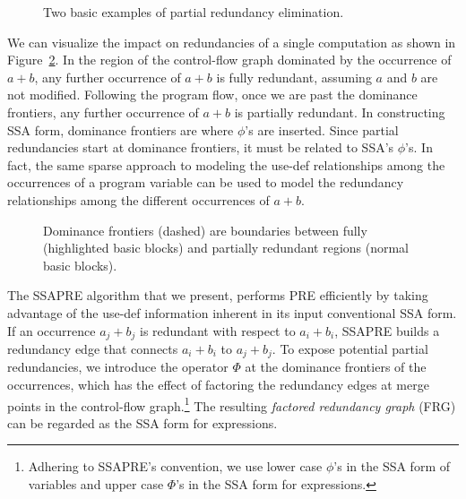 \begin{figure}
\centering
\hfill
{}
\caption{Two basic examples of partial redundancy elimination.}
\label{fig:pre-examples}
\end{figure}

We can visualize the impact on redundancies of a single computation as shown in Figure~\ref{fig:ssapre-motive}. 
In the region of the control-flow graph dominated by the occurrence of $a+b$, any further occurrence of $a+b$ is fully redundant, assuming $a$ and $b$ are not modified. 
Following the program flow, once we are past the dominance frontiers, any further occurrence of $a+b$ is partially redundant. 
In constructing SSA form, dominance frontiers are where $\phi$'s are inserted. 
Since partial redundancies start at dominance frontiers, it must be related to SSA's $\phi$'s. 
In fact, the same sparse approach to modeling the use-def relationships among the occurrences of a program variable can be used to model the redundancy relationships among the different occurrences of $a+b$.

\begin{figure}
\centering
\caption{Dominance frontiers (dashed) are boundaries between fully (highlighted basic blocks) and partially redundant regions (normal basic blocks).}
\label{fig:ssapre-motive}
\end{figure}

The SSAPRE algorithm that we present, performs PRE efficiently by taking advantage of the use-def information inherent in its input conventional SSA form. 
If an occurrence $a_j+b_j$ is redundant with respect to $a_i+b_i$, SSAPRE builds a redundancy edge that connects $a_i+b_i$ to $a_j+b_j$. 
To expose potential partial redundancies, we introduce the operator $\Phi$\index{\PHIfun} at the dominance frontiers of the occurrences, which has the effect of factoring the redundancy edges at merge points in the control-flow graph.\footnote{Adhering to SSAPRE's convention, we use lower case $\phi$'s in the SSA form of variables and upper case $\Phi$'s in the SSA form for expressions.} 
The resulting \emph{factored redundancy graph} (FRG) can be regarded as the SSA form for expressions.

